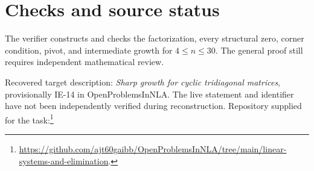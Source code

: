 \documentclass[11pt]{article}
\begin{document}
\section{Checks and source status}
The verifier constructs and checks the factorization, every structural zero, corner condition, pivot, and intermediate growth for $4\le n\le30$. The general proof still requires independent mathematical review.

Recovered target description: \emph{Sharp growth for cyclic tridiagonal matrices}, provisionally IE-14 in OpenProblemsInNLA. The live statement and identifier have not been independently verified during reconstruction. Repository supplied for the task:\footnote{\url{https://github.com/ajt60gaibb/OpenProblemsInNLA/tree/main/linear-systems-and-elimination}.}
\end{document}
